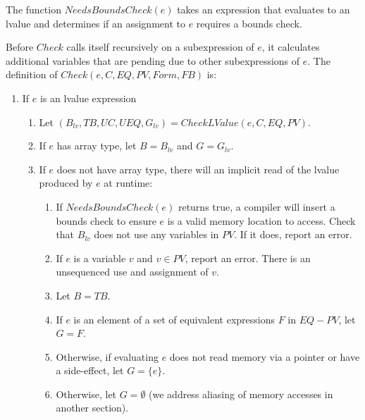 The function $NeedsBoundsCheck(e)$ takes
an expression that evaluates to an lvalue and determines if an 
assignment to $e$ requires a bounds check.

Before $Check$ calls itself recursively on a subexpression of $e$, it calculates 
additional variables that are pending due to other subexpressions of $e$.
The definition of $Check(e, C, EQ, PV, Form, FB)$ is:
\begin{enumerate}
\item If $e$ is an lvalue expression
\begin{enumerate}
\item Let $(B_{lv}, TB, UC, UEQ, G_{lv}) = CheckLValue(e, C, EQ,PV)$.
\item If $e$ has array type, let $B = B_{lv}$ and $G = G_{lv}$.
\item If $e$ does not have array type, there will an implicit read of the lvalue produced by $e$
at runtime:
\begin{enumerate}
\item If $NeedsBoundsCheck(e)$ returns true, a compiler will insert a bounds check 
to ensure $e$ is a valid memory location to access.  Check that $B_{lv}$ does not use any variables in 
$PV$.  If it does, report an error.
\item If $e$ is a variable $v$ and $v \in PV$, report an error.  There is an unsequenced use and
assignment of $v$.
\item Let $B = TB$. 
\item If $e$ is an element of a set of equivalent expressions $F$ in $EQ - PV$, let $G = F$. 
\item Otherwise, if evaluating $e$ does not read memory via a pointer or have a side-effect, let $G = \{ e \}$.  
\item Otherwise, let $G = \emptyset$ (we address aliasing of memory accesses in another section).
\end{enumerate}
\end{enumerate}



\end{enumerate}

